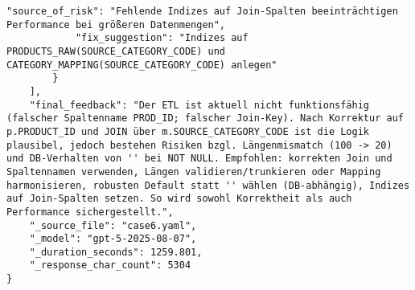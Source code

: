 \begin{lstlisting}[caption={Ausgabe: GPT-5 Anwendungsfall 6 Konsistenzdurchlauf},label={gpt_case6_prompt2}]
            "source_of_risk": "Fehlende Indizes auf Join-Spalten beeinträchtigen Performance bei größeren Datenmengen",
            "fix_suggestion": "Indizes auf PRODUCTS_RAW(SOURCE_CATEGORY_CODE) und CATEGORY_MAPPING(SOURCE_CATEGORY_CODE) anlegen"
        }
    ],
    "final_feedback": "Der ETL ist aktuell nicht funktionsfähig (falscher Spaltenname PROD_ID; falscher Join-Key). Nach Korrektur auf p.PRODUCT_ID und JOIN über m.SOURCE_CATEGORY_CODE ist die Logik plausibel, jedoch bestehen Risiken bzgl. Längenmismatch (100 -> 20) und DB-Verhalten von '' bei NOT NULL. Empfohlen: korrekten Join und Spaltennamen verwenden, Längen validieren/trunkieren oder Mapping harmonisieren, robusten Default statt '' wählen (DB-abhängig), Indizes auf Join-Spalten setzen. So wird sowohl Korrektheit als auch Performance sichergestellt.",
    "_source_file": "case6.yaml",
    "_model": "gpt-5-2025-08-07",
    "_duration_seconds": 1259.801,
    "_response_char_count": 5304
}
\end{lstlisting}

